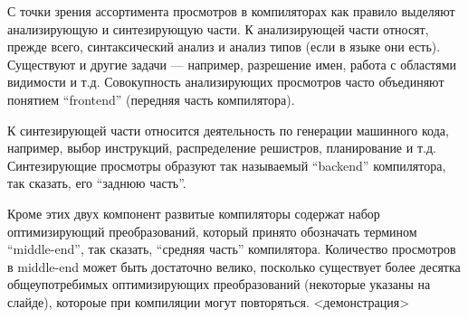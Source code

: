 \documentclass{article}
\begin{document}
С точки зрения ассортимента просмотров в компиляторах как правило выделяют анализирующую и синтезирующую части. К анализирующей части относят,
прежде всего, синтаксический анализ и анализ типов (если в языке они есть). Существуют и другие задачи --- например, разрешение имен, работа с
областями видимости и т.д. Совокупность анализирующих просмотров часто объединяют понятием ``frontend'' (передняя часть компилятора).

К синтезирующей части относится деятельность по генерации машинного кода, например, выбор инструкций, распределение решистров, планирование и т.д.
Синтезирующие просмотры образуют так называемый ``backend'' компилятора, так сказать, его ``заднюю часть''.

Кроме этих двух компонент развитые компиляторы содержат набор оптимизирующий преобразований, который принято обозначать термином ``middle-end'',
так сказать, ``средняя часть'' компилятора. Количество просмотров в middle-end может быть достаточно велико, посколько существует более
десятка общеупотребимых оптимизирующих преобразований (некоторые указаны на слайде), котороые при компиляции могут повторяться.
<демонстрация>
\end{document}
